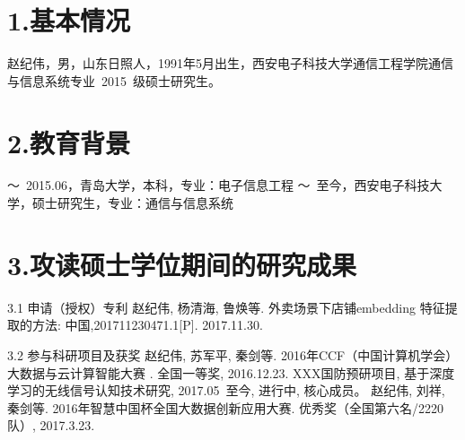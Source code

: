 
\begin{resume}

\section*{1.\hspace{0.75em}基本情况}
赵纪伟，男，山东日照人，1991年5月出生，西安电子科技大学通信工程学院通信与信息系统专业~2015~级硕士研究生。
\section*{2.\hspace{0.75em}教育背景}
\begin{resumelist*}
～~2015.06，青岛大学，本科，专业：电子信息工程
～~至今，西安电子科技大学，硕士研究生，专业：通信与信息系统
\end{resumelist*}

\section*{3.\hspace{0.75em}攻读硕士学位期间的研究成果}

\begin{resumelist}{\hspace{-0.25em}3.1\hspace{0.5em} 申请（授权）专利}
\resumelistitem 赵纪伟, 杨清海, 鲁焕等. 外卖场景下店铺embedding 特征提取的方法: 中国,201711230471.1[P]. 2017.11.30.
\end{resumelist}

\begin{resumelist}{\hspace{-0.25em}3.2\hspace{0.5em} 参与科研项目及获奖}
\resumelistitem 赵纪伟, 苏军平, 秦剑等. 2016年CCF（中国计算机学会）大数据与云计算智能大赛
. 全国一等奖, 2016.12.23.
\resumelistitem XXX国防预研项目, 基于深度学习的无线信号认知技术研究, 2017.05~至今, 进行中, 核心成员。
\resumelistitem 赵纪伟, 刘祥, 秦剑等. 2016年智慧中国杯全国大数据创新应用大赛. 
优秀奖（全国第六名/2220队）, 2017.3.23.
\end{resumelist}
\end{resume}
